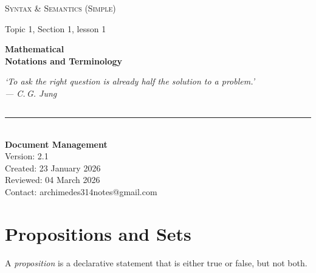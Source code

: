 \documentclass[a4paper, twoside]{article}
\newcommand{\copyrightpage}{
  \pagestyle{copyright}
}
\begin{document}
\begin{titlepage}
\centering

\vspace*{3cm}

{\Huge\scshape Syntax \& Semantics (Simple)\par}
\vspace{0.3cm}

{\large Topic 1, Section 1, lesson 1\par}

\vspace{1.2cm}

{\LARGE\bfseries Mathematical \\[0.3em]
\large Notations and Terminology\par}
\vfill

\begin{minipage}{0.7\textwidth}
\centering
\small\itshape
`To ask the right question is already half the solution to a problem.'\\[0.3cm]
— C.\,G. Jung
\end{minipage}

\vspace{1.5cm}

\begin{flushleft}
    \section*{} 
    \rule{0.5\linewidth}{0.4pt} \\[0.3cm]
    \textbf{Document Management} \\
    Version: 2.1  \\
    Created: 23 January 2026 \\ 
    Reviewed: 04 March 2026 \\
    Contact: archimedes314notes@gmail.com
\end{flushleft}

\end{titlepage}

\newpage

\restoregeometry 
{}
\setcounter{page}{1}
\copyrightpage

\section{Propositions and Sets}

A \textit{proposition} is a declarative statement that is either true or false, but not both. 
\end{document}
